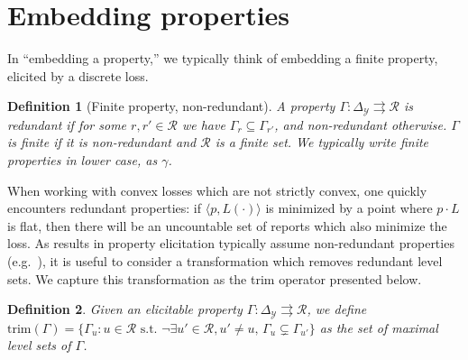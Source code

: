 \documentclass[12pt]{article}
\newcommand{\reals}{\mathbb{R}}
\newcommand{\prop}[1]{\mathrm{prop}[#1]}
\newcommand{\simplex}{\Delta_\Y}
\newcommand{\R}{\mathcal{R}}
\newcommand{\Y}{\mathcal{Y}}
\newcommand{\inprod}[2]{\langle #1, #2 \rangle}%
\newcommand{\toto}{\rightrightarrows}
\newcommand{\trim}{\mathrm{trim}}
\newtheorem{definition}{Definition}
\begin{document}
\section{Embedding properties}\label{app:embed-props}
In ``embedding a property,'' we typically think of embedding a finite property, elicited by a discrete loss.
\begin{definition}[Finite property, non-redundant]
  A property $\Gamma:\simplex\toto\R$ is \emph{redundant} if for some $r,r'\in\R$ we have $\Gamma_r \subseteq \Gamma_{r'}$, and \emph{non-redundant} otherwise.
  $\Gamma$ is \emph{finite} if it is non-redundant and $\R$ is a finite set.
  We typically write finite properties in lower case, as $\gamma$.
\end{definition}


When working with convex losses which are not strictly convex, one quickly encounters redundant properties: if $\inprod{p}{L(\cdot)}$ is minimized by a point where $p\cdot L$ is flat, then there will be an uncountable set of reports which also minimize the loss.
As results in property elicitation typically assume non-redundant properties (e.g.~\cite{frongillo2014general,frongillo2015elicitation}), it is useful to consider a transformation which removes redundant level sets.
We capture this transformation as the trim operator presented below.

\begin{definition}\label{def:trim}
  Given an elicitable property $\Gamma:\simplex \toto\R$, we define $\trim(\Gamma) = \{\Gamma_u : u \in \R \text{ s.t. } \neg\exists u'\in\R,u'\neq u,\, \Gamma_u \subsetneq \Gamma_{u'}\}$ as the set of maximal level sets of $\Gamma$.
\end{definition}
\end{document}
